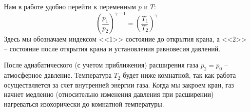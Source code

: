 \documentclass[a4paper,12pt]{report}
\begin{document}
\begin{multicols}{2}
        Нам в работе удобно перейти к переменным $p$ и $T$:
        \begin{equation}
            \label{pT-final}
            \left( \frac{p_1}{p_2} \right)^{\gamma-1}=\left( \frac{T_1}{T_2} \right)^\gamma
        \end{equation}
        Здесь мы обозначаем индексом <<1>> состояние до открытия крана, а <<2>> -- состояние после открытия крана и установления равновесия давлений. 
        
        После адиабатического (с учетом приближения) расширения газа $p_2=p_0$ -- атмосферное давление. Температура $T_2$ будет ниже комнатной, так как работа осуществляется за счет внутренней энергии газа. Когда мы закроем кран, газ начнет медленно (относительно изменения давления при расширении) нагреваться изохорически до комнатной температуры.
        

\end{multicols}
\end{document}
